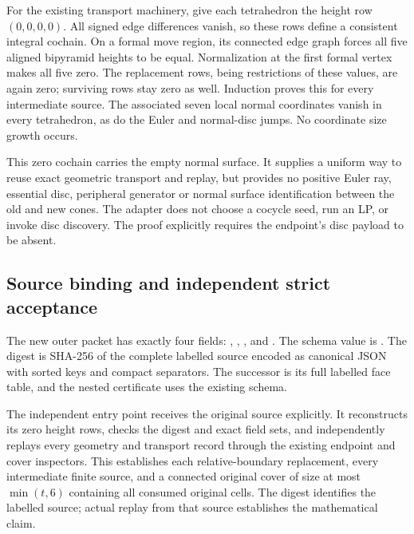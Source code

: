 For the existing transport machinery, give each tetrahedron the height
row $(0,0,0,0)$.  All signed edge differences vanish, so these rows
define a consistent integral cochain.  On a formal move region, its
connected edge graph forces all five aligned bipyramid heights to be
equal.  Normalization at the first formal vertex makes all five zero.
The replacement rows, being restrictions of these values, are again
zero; surviving rows stay zero as well.  Induction proves this for
every intermediate source.  The associated seven local normal
coordinates vanish in every tetrahedron, as do the Euler and normal-disc
jumps.  No coordinate size growth occurs.

This zero cochain carries the empty normal surface.  It supplies a
uniform way to reuse exact geometric transport and replay, but provides
no positive Euler ray, essential disc, peripheral generator or normal
surface identification between the old and new cones.  The adapter
does not choose a cocycle seed, run an LP, or invoke disc discovery.
The proof explicitly requires the endpoint's disc payload to be absent.

\subsection{Source binding and independent strict acceptance}

The new outer packet has exactly four fields:
, , , and
.  The schema value is
.  The digest is SHA-256 of the complete
labelled source encoded as canonical JSON with sorted keys and compact
separators.  The successor is its full labelled face table, and the
nested certificate uses the existing
 schema.

The independent entry point 
receives the original source explicitly.  It reconstructs its zero
height rows, checks the digest and exact field sets, and independently
replays every geometry and transport record through the existing
endpoint and cover inspectors.  This establishes each relative-boundary
replacement, every intermediate finite source, and a connected original
cover of size at most $\min(t,6)$ containing all consumed original cells.
The digest identifies the labelled source; actual replay from that
source establishes the mathematical claim.

